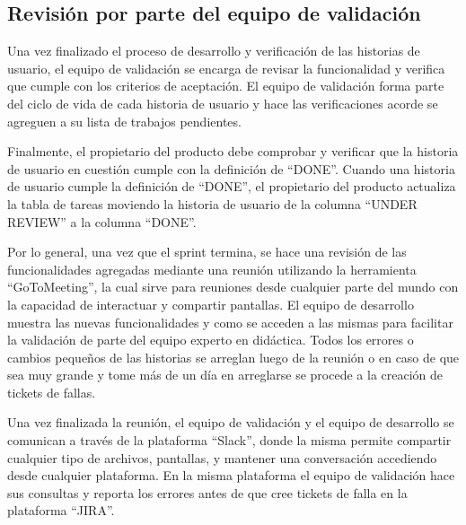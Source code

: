 \subsection{Revisión por parte del equipo de validación}
Una vez finalizado el proceso de desarrollo y verificación de las historias de usuario, el equipo de validación se encarga de revisar la funcionalidad y verifica que cumple con los criterios de aceptación. El equipo de validación forma parte del ciclo de vida de cada historia de usuario y hace las verificaciones acorde se agreguen a su lista de trabajos pendientes.

Finalmente, el propietario del producto debe comprobar y verificar que la historia de usuario en cuestión cumple con la definición de \enquote{DONE}. Cuando una historia de usuario cumple la definición de \enquote{DONE}, el propietario del producto actualiza la tabla de tareas moviendo la historia de usuario de la columna \enquote{UNDER REVIEW} a la columna \enquote{DONE}.

Por lo general, una vez que el sprint termina, se hace una revisión de las funcionalidades agregadas mediante una reunión utilizando la herramienta \enquote{GoToMeeting}, la cual sirve para reuniones desde cualquier parte del mundo con la capacidad de interactuar y compartir pantallas. El equipo de desarrollo muestra las nuevas funcionalidades y como se acceden a las mismas para facilitar la validación de parte del equipo experto en didáctica. Todos los errores o cambios pequeños de las historias se arreglan luego de la reunión o en caso de que sea muy grande y tome más de un día en arreglarse se procede a la creación de tickets de fallas.

Una vez finalizada la reunión, el equipo de validación y el equipo de desarrollo se comunican a través de la plataforma \enquote{Slack}, donde la misma permite compartir cualquier tipo de archivos, pantallas, y mantener una conversación accediendo desde cualquier plataforma. En la misma plataforma el equipo de validación hace sus consultas y reporta los errores antes de que cree tickets de falla en la plataforma \enquote{JIRA}.